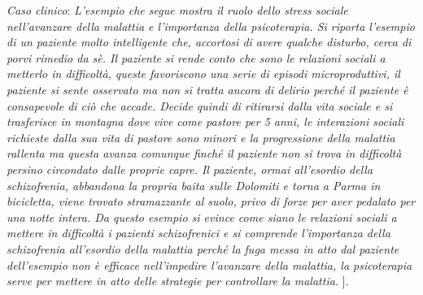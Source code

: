 \documentclass[]{article}
\begin{document}
\emph{Caso clinico}: \emph{L'esempio che segue mostra il ruolo dello
stress sociale nell'avanzare della malattia e l'importanza della
psicoterapia. Si riporta l'esempio di un paziente molto intelligente
che, accortosi di avere qualche disturbo, cerca di porvi rimedio da sè.
Il paziente si rende conto che sono le relazioni sociali a metterlo in
difficoltà, queste favoriscono una serie di episodi microproduttivi, il
paziente si sente osservato ma non si tratta ancora di delirio perché il
paziente è consapevole di ciò che accade. Decide quindi di ritirarsi
dalla vita sociale e si trasferisce in montagna dove vive come pastore
per 5 anni, le interazioni sociali richieste dalla sua vita di pastore
sono minori e la progressione della malattia rallenta ma questa avanza
comunque finché il paziente non si trova in difficoltà persino
circondato dalle proprie capre. Il paziente, ormai all'esordio della
schizofrenia, abbandona la propria baita sulle Dolomiti e torna a Parma
in bicicletta, viene trovato stramazzante al suolo, privo di forze per
aver pedalato per una notte intera. Da questo esempio si evince come
siano le relazioni sociali a mettere in difficoltà i pazienti
schizofrenici e si comprende l'importanza della schizofrenia all'esordio
della malattia perché la fuga messa in atto dal paziente dell'esempio
non è efficace nell'impedire l'avanzare della malattia, la psicoterapia
serve per mettere in atto delle strategie per controllare la malattia.}
{]}.
\end{document}
